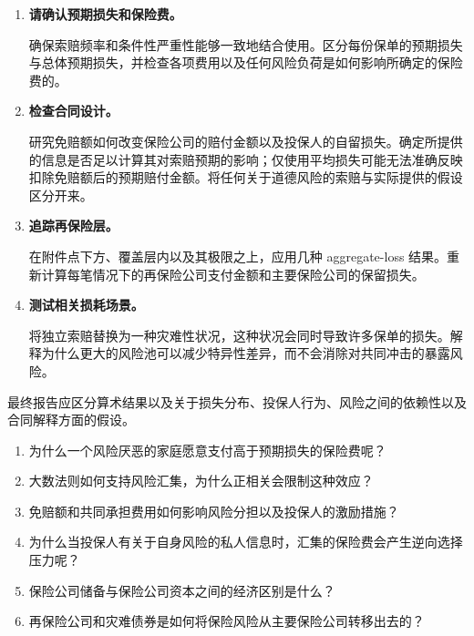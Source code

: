 \begin{enumerate}

\item \textbf{请确认预期损失和保险费。}

确保索赔频率和条件性严重性能够一致地结合使用。区分每份保单的预期损失与总体预期损失，并检查各项费用以及任何风险负荷是如何影响所确定的保险费的。

\item \textbf{检查合同设计。}

研究免赔额如何改变保险公司的赔付金额以及投保人的自留损失。确定所提供的信息是否足以计算其对索赔预期的影响；仅使用平均损失可能无法准确反映扣除免赔额后的预期赔付金额。将任何关于道德风险的索赔与实际提供的假设区分开来。

\item \textbf{追踪再保险层。}

在附件点下方、覆盖层内以及其极限之上，应用几种 aggregate-loss 结果。重新计算每笔情况下的再保险公司支付金额和主要保险公司的保留损失。

\item \textbf{测试相关损耗场景。}

将独立索赔替换为一种灾难性状况，这种状况会同时导致许多保单的损失。解释为什么更大的风险池可以减少特异性差异，而不会消除对共同冲击的暴露风险。

\end{enumerate}

最终报告应区分算术结果以及关于损失分布、投保人行为、风险之间的依赖性以及合同解释方面的假设。




\begin{enumerate}

\item 为什么一个风险厌恶的家庭愿意支付高于预期损失的保险费呢？

\item 大数法则如何支持风险汇集，为什么正相关会限制这种效应？

\item 免赔额和共同承担费用如何影响风险分担以及投保人的激励措施？

\item 为什么当投保人有关于自身风险的私人信息时，汇集的保险费会产生逆向选择压力呢？

\item 保险公司储备与保险公司资本之间的经济区别是什么？

\item 再保险公司和灾难债券是如何将保险风险从主要保险公司转移出去的？

\end{enumerate}


